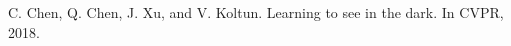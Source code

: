\documentclass[letterpaper,12pt]{article}
\begin{document}
	
	
		
		\renewcommand{\refname}{References}
	

	\begin{thebibliography}{00}
			
	\label{cite:b1}
		C. Chen, Q. Chen, J. Xu, and V. Koltun. Learning to see in the dark. In CVPR, 2018.
			
			
			

			
	\end{thebibliography}
		
	
	
	
		
	
\end{document}

